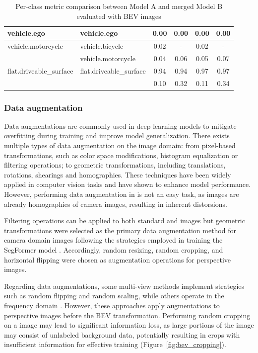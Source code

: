 \begin{table}[h]
\begin{tabular}{llcccc}
    vehicle.ego & vehicle.ego & 0.00 & 0.00 & 0.00 & 0.00 \\
    \midrule
    vehicle.motorcycle & vehicle.bicycle & 0.02 & - & 0.02 & - \\
     & vehicle.motorcycle & 0.04 & 0.06 & 0.05 & 0.07 \\
    \midrule
    flat.driveable\_surface & flat.driveable\_surface & 0.94 & 0.94 & 0.97 & 0.97 \\
    \bottomrule
     & & 0.10 & 0.32 & 0.11 & 0.34 \\
    \bottomrule
    \end{tabular}
    \caption{Per-class metric comparison between Model A and merged Model B evaluated with BEV images}
    \label{tab:merging_comparison_bev}
\end{table}
    



\subsubsection{Data augmentation} \label{sec:data_augmentation}
Data augmentations are commonly used in deep learning models to mitigate overfitting during training and improve model generalization. There exists multiple types of data augmentation on the image domain: from pixel-based transformations, such as color space modifications, histogram equalization or filtering operations; to geometric transformations, including translations, rotations, shearings and homographies. These techniques have been widely applied in computer vision tasks and have shown to enhance model performance. However, performing data augmentation in  is not an easy task, as  images are already homographies of camera images, resulting in inherent distorsions.

Filtering operations can be applied to both standard and  images but geometric transformations were selected as the primary data augmentation method for camera domain images following the strategies employed in training the SegFormer model \cite{segformer}. Accordingly, random resizing, random cropping, and horizontal flipping were chosen as augmentation operations for perspective images.

Regarding  data augmentations, some multi-view methods implement strategies such as random flipping and random scaling, while others operate in the frequency domain \cite{HSDA}. However, these approaches apply augmentations to perspective images before the BEV transformation. Performing random cropping on a  image may lead to significant information loss, as large portions of the image may consist of unlabeled background data, potentially resulting in crops with insufficient information for effective training (Figure~\ref{fig:bev_cropping}). 

